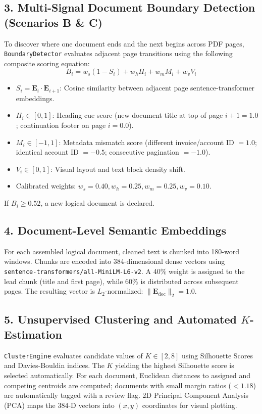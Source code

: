 \documentclass[11pt,a4paper]{article}
\begin{document}
\subsection{3. Multi-Signal Document Boundary Detection (Scenarios B \& C)}
To discover where one document ends and the next begins across PDF pages, \texttt{BoundaryDetector} evaluates adjacent page transitions using the following composite scoring equation:
\begin{equation*}
B_i = w_s (1 - S_i) + w_h H_i + w_m M_i + w_v V_i
\end{equation*}
\begin{itemize}[leftmargin=*, noitemsep]
    \item $S_i = \mathbf{E}_i \cdot \mathbf{E}_{i+1}$: Cosine similarity between adjacent page sentence-transformer embeddings.
    \item $H_i \in [0, 1]$: Heading cue score (new document title at top of page $i+1 = 1.0$; continuation footer on page $i = 0.0$).
    \item $M_i \in [-1, 1]$: Metadata mismatch score (different invoice/account ID $= 1.0$; identical account ID $= -0.5$; consecutive pagination $= -1.0$).
    \item $V_i \in [0, 1]$: Visual layout and text block density shift.
    \item Calibrated weights: $w_s = 0.40, w_h = 0.25, w_m = 0.25, w_v = 0.10$.
\end{itemize}
If $B_i \ge 0.52$, a new logical document is declared.

\subsection{4. Document-Level Semantic Embeddings}
For each assembled logical document, cleaned text is chunked into 180-word windows. Chunks are encoded into 384-dimensional dense vectors using \texttt{sentence-transformers/all-MiniLM-L6-v2}. A 40\% weight is assigned to the lead chunk (title and first page), while 60\% is distributed across subsequent pages. The resulting vector is $L_2$-normalized: $\|\mathbf{E}_{\text{doc}}\|_2 = 1.0$.

\subsection{5. Unsupervised Clustering and Automated $K$-Estimation}
\texttt{ClusterEngine} evaluates candidate values of $K \in [2, 8]$ using Silhouette Scores and Davies-Bouldin indices. The $K$ yielding the highest Silhouette score is selected automatically. For each document, Euclidean distances to assigned and competing centroids are computed; documents with small margin ratios ($< 1.18$) are automatically tagged with a review flag. 2D Principal Component Analysis (PCA) maps the 384-D vectors into $(x, y)$ coordinates for visual plotting.
\end{document}
